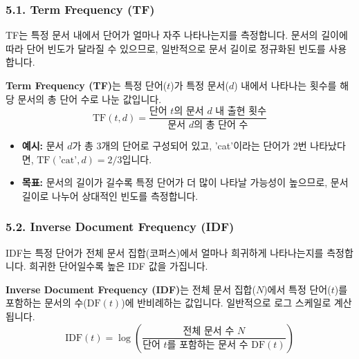 \documentclass[11pt,a4paper]{article}
\begin{document}
\subsubsection*{5.1. Term Frequency (TF)}
TF는 특정 문서 내에서 단어가 얼마나 자주 나타나는지를 측정합니다. 문서의 길이에 따라 단어 빈도가 달라질 수 있으므로, 일반적으로 문서 길이로 정규화된 빈도를 사용합니다.

\begin{tcolorbox}[mybox, title=Term Frequency (TF) 정의]
\textbf{Term Frequency (TF)}는 특정 단어($t$)가 특정 문서($d$) 내에서 나타나는 횟수를 해당 문서의 총 단어 수로 나눈 값입니다.
$$ \text{TF}(t, d) = \frac{\text{단어 } t \text{의 문서 } d \text{ 내 출현 횟수}}{\text{문서 } d \text{의 총 단어 수}} $$
\end{tcolorbox}

\begin{itemize}
    \item \textbf{예시:} 문서 $d$가 총 3개의 단어로 구성되어 있고, 'cat'이라는 단어가 2번 나타났다면, $\text{TF}(\text{'cat'}, d) = 2/3$입니다.
    \item \textbf{목표:} 문서의 길이가 길수록 특정 단어가 더 많이 나타날 가능성이 높으므로, 문서 길이로 나누어 상대적인 빈도를 측정합니다.
\end{itemize}

\subsubsection*{5.2. Inverse Document Frequency (IDF)}
IDF는 특정 단어가 전체 문서 집합(코퍼스)에서 얼마나 희귀하게 나타나는지를 측정합니다. 희귀한 단어일수록 높은 IDF 값을 가집니다.

\begin{tcolorbox}[mybox, title=Inverse Document Frequency (IDF) 정의]
\textbf{Inverse Document Frequency (IDF)}는 전체 문서 집합($N$)에서 특정 단어($t$)를 포함하는 문서의 수($\text{DF}(t)$)에 반비례하는 값입니다. 일반적으로 로그 스케일로 계산됩니다.
$$ \text{IDF}(t) = \log \left( \frac{\text{전체 문서 수 } N}{\text{단어 } t \text{를 포함하는 문서 수 } \text{DF}(t)} \right) $$
\end{tcolorbox}
\end{document}
